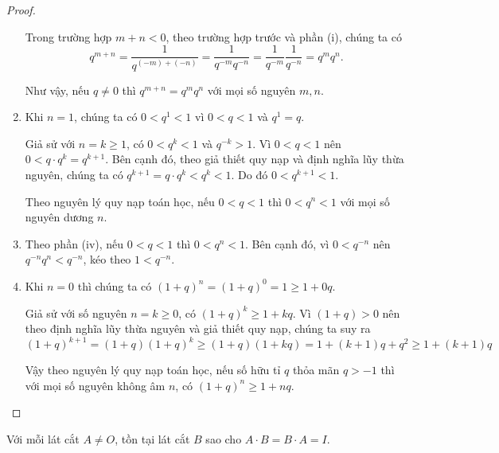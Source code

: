 \begin{proof}
\begin{enumerate}[label={(\roman*)}]
              Trong trường hợp $m + n < 0$, theo trường hợp trước và phần (i), chúng ta có
              \[
                  q^{m+n} = \dfrac{1}{q^{(-m) + (-n)}} = \dfrac{1}{q^{-m}q^{-n}} = \dfrac{1}{q^{-m}}\dfrac{1}{q^{-n}} = q^{m}q^{n}.
              \]

              Như vậy, nếu $q\ne 0$ thì $q^{m + n} = q^{m}q^{n}$ với mọi số nguyên $m, n$.
        \item Khi $n = 1$, chúng ta có $0 < q^{1} < 1$ vì $0 < q < 1$ và $q^{1} = q$.

              Giả sử với $n = k\geq 1$, có $0 < q^{k} < 1$ và $q^{-k} > 1$. Vì $0 < q < 1$ nên $0 < q\cdot q^{k} = q^{k+1}$. Bên cạnh đó, theo giả thiết quy nạp và định nghĩa lũy thừa nguyên, chúng ta có $q^{k+1} = q\cdot q^{k} < q^{k} < 1$. Do đó $0 < q^{k+1} < 1$.

              Theo nguyên lý quy nạp toán học, nếu $0 < q < 1$ thì $0 < q^{n} < 1$ với mọi số nguyên dương $n$.
        \item Theo phần (iv), nếu $0 < q < 1$ thì $0 < q^{n} < 1$. Bên cạnh đó, vì $0 < q^{-n}$ nên $q^{-n}q^{n} < q^{-n}$, kéo theo $1 < q^{-n}$.
        \item Khi $n = 0$ thì chúng ta có ${(1 + q)}^{n} = {(1 + q)}^{0} = 1 \geq 1 + 0q$.

              Giả sử với số nguyên $n = k\geq 0$, có ${(1 + q)}^{k} \geq 1 + kq$. Vì $(1 + q) > 0$ nên theo định nghĩa lũy thừa nguyên và  giả thiết quy nạp, chúng ta suy ra
              \[
                  {(1 + q)}^{k+1} = (1 + q){(1 + q)}^{k} \geq (1 + q)(1 + kq) = 1 + (k+1)q + q^{2} \geq 1 + (k + 1)q
              \]

              Vậy theo nguyên lý quy nạp toán học, nếu số hữu tỉ $q$ thỏa mãn $q > -1$ thì với mọi số nguyên không âm $n$, có ${(1 + q)}^{n}\geq 1 + nq$.
    \end{enumerate}
\end{proof}

\begin{theorem}
    Với mỗi lát cắt $A\ne O$, tồn tại lát cắt $B$ sao cho $A\cdot B = B\cdot A = I$.
\end{theorem}

